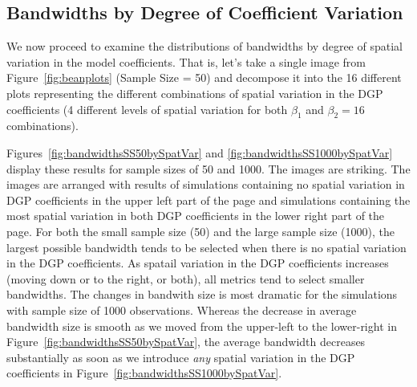 \documentclass{article}\usepackage{graphicx, color}
\begin{document}
\subsection{Bandwidths by Degree of Coefficient Variation}

We now proceed to examine the distributions of bandwidths by degree of spatial variation in the model coefficients. That is, let's take a single image from Figure~\ref{fig:beanplots} (Sample Size = 50) and decompose it into the 16 different plots representing the different combinations of spatial variation in the DGP coefficients (4 different levels of spatial variation for both $\beta _1$ and $\beta _2 = 16$ combinations).

Figures~\ref{fig:bandwidthsSS50bySpatVar} and \ref{fig:bandwidthsSS1000bySpatVar} display these results for sample sizes of 50 and 1000. The images are striking. The images are arranged with results of simulations containing no spatial variation in DGP coefficients in the upper left part of the page and simulations containing the most spatial variation in both DGP coefficients in the lower right part of the page. For both the small sample size (50) and the large sample size (1000), the largest possible bandwidth tends to be selected when there is no spatial variation in the DGP coefficients. As spatail variation in the DGP coefficients increases (moving down or to the right, or both), all metrics tend to select smaller bandwidths. The changes in bandwith size is most dramatic for the simulations with sample size of 1000 observations. Whereas the decrease in average bandwidth size is smooth as we moved from the upper-left to the lower-right in Figure~\ref{fig:bandwidthsSS50bySpatVar}, the average bandwidth decreases substantially as soon as we introduce \emph{any} spatial variation in the DGP coefficients in Figure~\ref{fig:bandwidthsSS1000bySpatVar}.
\end{document}
